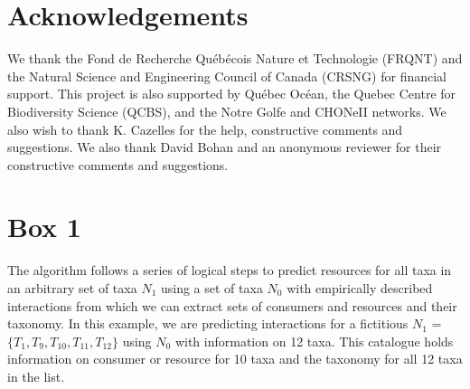 \section{Acknowledgements}
We thank the Fond de Recherche Québécois Nature et Technologie (FRQNT) and the Natural Science and Engineering Council of Canada (CRSNG) for financial support. This project is also supported by Québec Océan, the Quebec Centre for Biodiversity Science (QCBS), and the Notre Golfe and CHONeII networks. We also wish to thank K. Cazelles for the help, constructive comments and suggestions. We also thank David Bohan and an anonymous reviewer for their constructive comments and suggestions.



\section{Box 1}

The algorithm follows a series of logical steps to predict resources for all taxa in an arbitrary set of taxa $N_1$ using a set of taxa $N_0$ with empirically described interactions from which we can extract sets of consumers and resources and their taxonomy. In this example, we are predicting interactions for a fictitious $N_1$
 = $\{T_1, T_9, T_{10},T_{11}, T_{12}\}$ using $N_0$ with information on 12 taxa. This catalogue holds information on consumer or resource for 10 taxa and the taxonomy for all 12 taxa in the list.

